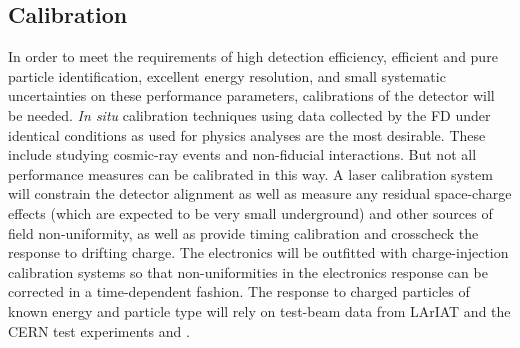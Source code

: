 

\subsection{Calibration}

In order to meet the requirements of high detection efficiency, efficient and
pure particle identification, excellent energy resolution, and small systematic
uncertainties on these performance parameters, calibrations of the detector
will be needed.  {\it In situ} calibration techniques using data collected by the FD
under identical conditions as used for physics analyses are the most desirable.
These include studying cosmic-ray events and non-fiducial interactions.  But not
all performance measures can be calibrated in this way.  A laser calibration system
will constrain the detector alignment as well as measure any residual space-charge effects
(which are expected to be very small underground) and other sources of field non-uniformity,
as well as provide timing calibration and crosscheck the response to drifting charge.  
The electronics will be outfitted with
charge-injection calibration systems so that non-uniformities in the electronics response
can be corrected in a time-dependent fashion.  The response to charged particles of known
energy and particle type will rely on test-beam data from LArIAT and the CERN test
experiments \cernsingleproto{} and \cerndualproto.
